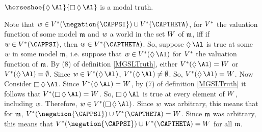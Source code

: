 \begin{majorILnc}{}
$\horseshoe{\DIAMOND\Al}{\BOX\DIAMOND\Al}$ is a modal truth. 
\end{majorILnc}
\begin{PROOF}
Note that $\world{w}\in\integer{V}^*(\negation{\CAPPSI})\cup\integer{V}^*(\CAPTHETA)$, for $V^*$ the valuation function of some model $\mathfrak{m}$ and $\mathit{w}$ a world in the set $W$ of $\mathfrak{m}$, iff if $\world{w}\in\integer{V}^*(\CAPPSI)$, then $\world{w}\in\integer{V}^*(\CAPTHETA)$. 
So, suppose $\DIAMOND\Al$ is true at some $\mathit{w}$ in some model $\mathfrak{m}$, i.e. suppose that $\world{w}\in\integer{V}^*(\DIAMOND\Al)$ for $V^*$ the valuation function of $\mathfrak{m}$. 
By (8) of definition \ref{MGSLTruth}, either $\integer{V}^*(\DIAMOND\Al)=\integer{W}$ or $\integer{V}^*(\DIAMOND\Al)=\emptyset$. 
Since $\world{w}\in\integer{V}^*(\DIAMOND\Al)$, $\integer{V}^*(\DIAMOND\Al)\neq\emptyset$. 
So, $\integer{V}^*(\DIAMOND\Al)=\integer{W}$. 
Now Consider $\BOX\DIAMOND\Al$. 
Since $\integer{V}^*(\DIAMOND\Al)=\integer{W}$, by (7) of definition \ref{MGSLTruth} it follows that $\integer{V}^*(\BOX\DIAMOND\Al)=\integer{W}$. 
So, $\BOX\DIAMOND\Al$ is true at every element of $W$, including $\mathit{w}$. 
Therefore, $\world{w}\in\integer{V}^*(\BOX\DIAMOND\Al)$. 
Since $\mathit{w}$ was arbitrary, this means that for $\mathfrak{m}$, $\integer{V}^*(\negation{\CAPPSI})\cup\integer{V}^*(\CAPTHETA)=\integer{W}$. 
Since $\mathfrak{m}$ was arbitrary, this means that $\integer{V}^*(\negation{\CAPPSI})\cup\integer{V}^*(\CAPTHETA)=\integer{W}$ for all $\mathfrak{m}$.
\end{PROOF}

